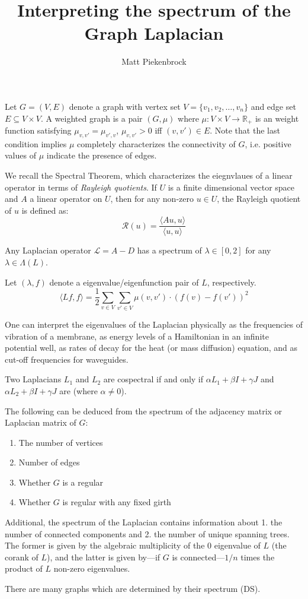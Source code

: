 \documentclass[10pt]{article}
\title{\vspace{-2.0em} Interpreting the spectrum of the Graph Laplacian\vspace{-0.5em}}
\author{Matt Piekenbrock}
\date{}
\begin{document}
 \vspace{-2em} \maketitle \vspace{-1em}
Let $G = (V, E)$ denote a graph with vertex set $V = \{v_1, v_2, \dots, v_n\}$ and edge set $E \subseteq V \times V$. A weighted graph is a pair $(G, \mu)$ where $\mu: V \times V \to \mathbb{R}_+$ is an weight function satisfying $\mu_{v,v'} = \mu_{v', v}$, $\mu_{v,v'} > 0$ iff $(v,v') \in E$. Note that the last condition implies $\mu$ completely characterizes the connectivity of $G$, i.e. positive values of $\mu$ indicate the presence of edges. 

We recall the Spectral Theorem, which characterizes the eiegnvlaues of a linear operator in terms of \emph{Rayleigh quotients}. If $U$ is a finite dimensional vector space and $A$ a linear operator on $U$, then for any non-zero $u \in U$, the Rayleigh quotient of $u$ is defined as: 
$$ \mathcal{R}(u) = \frac{\langle Au, u \rangle}{\langle u, u\rangle}$$

Any Laplacian operator $\mathcal{L} = A - D$ has a spectrum of $\lambda \in [0,2]$ for any $\lambda \in \Lambda(L)$.

Let $(\lambda, f)$ denote a eigenvalue/eigenfunction pair of $L$, respectively. 
$$\langle L f, f \rangle = \frac{1}{2} \sum\limits_{v \in V} \sum\limits_{v' \in V} \mu(v,v') \cdot \left(f(v) - f(v')\right)^2$$


One can interpret the eigenvalues of the Laplacian physically as the frequencies of vibration of a membrane, as energy levels of a Hamiltonian in an infinite potential well, as rates of decay for the heat (or mass diffusion) equation, and as cut-off frequencies for waveguides.

Two Laplacians $L_1$ and $L_2$ are cospectral if and only if $\alpha L_1 + \beta I + \gamma J$ and $\alpha L_2 + \beta I + \gamma J$ are (where $\alpha \neq 0$). 

The following can be deduced from the spectrum of the adjacency matrix or Laplacian matrix of $G$: 
\begin{enumerate}
	\item The number of vertices
	\item Number of edges
	\item Whether $G$ is a regular 
	\item Whether $G$ is regular with any fixed girth 
\end{enumerate}
Additional, the spectrum of the Laplacian contains information about 1. the number of connected components and 2. the number of unique spanning trees. The former is given by the algebraic multiplicity of the $0$ eigenvalue of $L$ (the corank of $L$), and the latter is given by---if $G$ is connected---$1/n$ times the product of $L$ non-zero eigenvalues. 

There are many graphs which are determined by their spectrum (DS). 
\end{document}
